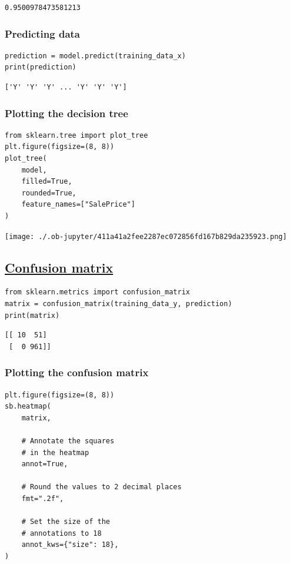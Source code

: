 \documentclass[11pt]{article}
\begin{document}
\label{org04673fd}
\begin{verbatim}
0.9500978473581213
\end{verbatim}
\subsubsection{Predicting data}
\label{sec:org29934d7}
\begin{verbatim}
prediction = model.predict(training_data_x)
print(prediction)
\end{verbatim}

\label{org6d1be31}
\begin{verbatim}
['Y' 'Y' 'Y' ... 'Y' 'Y' 'Y']
\end{verbatim}


 \newpage
\subsubsection{Plotting the decision tree}
\label{sec:orgcc80d72}
\begin{verbatim}
from sklearn.tree import plot_tree
plt.figure(figsize=(8, 8))
plot_tree(
    model,
    filled=True,
    rounded=True,
    feature_names=["SalePrice"]
)
\end{verbatim}

\begin{center}
\texttt{[image: ./.ob-jupyter/411a41a2fee2287ec072856fd167b829da235923.png]}
\label{org904fe48}
\end{center}

 \newpage
\subsection{\href{https://scikit-learn.org/stable/modules/generated/sklearn.metrics.confusion\_matrix.html}{Confusion matrix}}
\label{sec:org9258f5c}
\begin{verbatim}
from sklearn.metrics import confusion_matrix
matrix = confusion_matrix(training_data_y, prediction)
print(matrix)
\end{verbatim}

\label{orgaea97b1}
\begin{verbatim}
[[ 10  51]
 [  0 961]]
\end{verbatim}
\subsubsection{Plotting the confusion matrix}
\label{sec:org2ace095}
\begin{verbatim}
plt.figure(figsize=(8, 8))
sb.heatmap(
    matrix,

    # Annotate the squares
    # in the heatmap
    annot=True,

    # Round the values to 2 decimal places
    fmt=".2f",

    # Set the size of the
    # annotations to 18
    annot_kws={"size": 18},
)
\end{verbatim}
\end{document}

